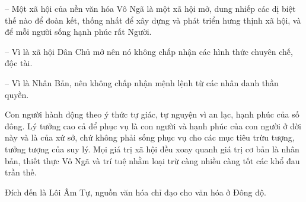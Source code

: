-- Một xã hội của nền văn hóa Vô Ngã là một xã hội mở, dung nhiếp các dị biệt thế nào để đoàn kết, thống nhất để xây dựng và phát triển hưng thịnh xã hội, và để mỗi người sống hạnh phúc rất Người.

-- Vì là xã hội Dân Chủ mở nên nó không chấp nhận các hình thức chuyên chế, độc tài.

-- Vì là Nhân Bản, nên không chấp nhận mệnh lệnh từ các nhân danh thần quyền.

Con người hành động theo ý thức tự giác, tự nguyện vì an lạc, hạnh phúc của số đông. Lý tưởng cao cả để phục vụ là con người và hạnh phúc của con người ở đời này và là của xứ sở, chứ không phải sống phục vụ cho các mục tiêu trừu tượng, tưởng tượng của suy lý. Mọi giá trị xã hội đều xoay quanh giá trị cơ bản là nhân bản, thiết thực Vô Ngã và trí tuệ nhằm loại trừ càng nhiều càng tốt các khổ đau trần thế.

Đích đến là Lôi Âm Tự, nguồn văn hóa chỉ đạo cho văn hóa ở Đông độ.
